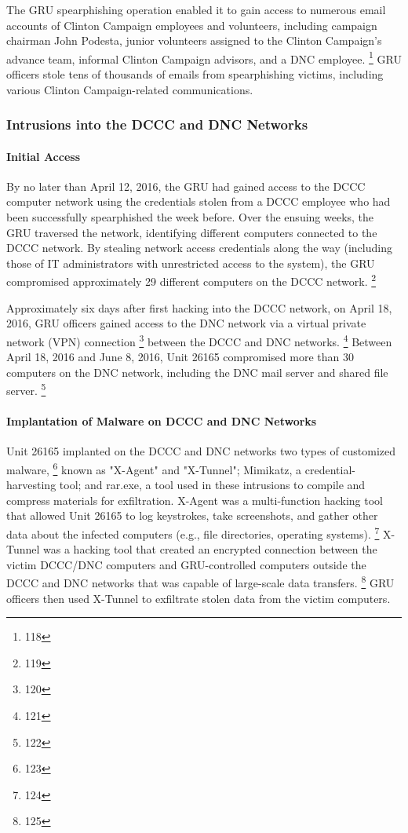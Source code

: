 The GRU spearphishing operation enabled it to gain access to numerous email accounts of Clinton Campaign employees and volunteers, including campaign chairman John Podesta, junior volunteers assigned to the Clinton Campaign's advance team, informal Clinton Campaign advisors, and a DNC employee.%
\footnote{118}
GRU officers stole tens of thousands of emails from spearphishing victims, including various Clinton Campaign-related communications.

\subsubsection{Intrusions into the DCCC and DNC Networks}

\paragraph{Initial Access}

By no later than April 12, 2016, the GRU had gained access to the DCCC computer network using the credentials stolen from a DCCC employee who had been successfully spearphished the week before.
Over the ensuing weeks, the GRU traversed the network, identifying different computers connected to the DCCC network.
By stealing network access credentials along the way (including those of IT administrators with unrestricted access to the system), the GRU compromised approximately 29 different computers on the DCCC network.%
\footnote{119}

Approximately six days after first hacking into the DCCC network, on April 18, 2016, GRU officers gained access to the DNC network via a virtual private network (VPN) connection%
\footnote{120}
between the DCCC and DNC networks.%
\footnote{121}
Between April 18, 2016 and June 8, 2016, Unit 26165 compromised more than 30 computers on the DNC network, including the DNC mail server and shared file server.%
\footnote{122}

\paragraph{Implantation of Malware on DCCC and DNC Networks}

Unit 26165 implanted on the DCCC and DNC networks two types of customized malware,%
\footnote{123}
known as "X-Agent" and "X-Tunnel";  Mimikatz, a credential-harvesting tool; and rar.exe, a tool used in these intrusions to compile and compress materials for exfiltration.
X-Agent was a multi-function hacking tool that allowed Unit 26165 to log keystrokes, take screenshots, and gather other data about the infected computers (e.g., file directories,  operating systems).%
\footnote{124}
X-Tunnel was a  hacking tool that created an encrypted connection between the victim DCCC/DNC computers and GRU-controlled computers outside the DCCC and DNC networks that was capable of large-scale data transfers.%
\footnote{125}
GRU officers then used X-Tunnel to exfiltrate stolen data from the victim computers.

